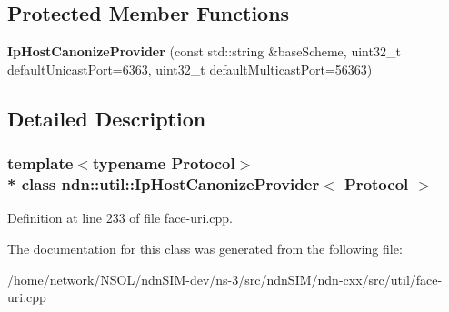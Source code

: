 \subsection*{Protected Member Functions}
\begin{DoxyCompactItemize}
\item 
{\bfseries Ip\+Host\+Canonize\+Provider} (const std\+::string \&base\+Scheme, uint32\+\_\+t default\+Unicast\+Port=6363, uint32\+\_\+t default\+Multicast\+Port=56363)\hypertarget{classndn_1_1util_1_1IpHostCanonizeProvider_af6c9093871592b3c6cec4cd4731137be}{}\label{classndn_1_1util_1_1IpHostCanonizeProvider_af6c9093871592b3c6cec4cd4731137be}

\end{DoxyCompactItemize}


\subsection{Detailed Description}
\subsubsection*{template$<$typename Protocol$>$\\*
class ndn\+::util\+::\+Ip\+Host\+Canonize\+Provider$<$ Protocol $>$}



Definition at line 233 of file face-\/uri.\+cpp.



The documentation for this class was generated from the following file\+:\begin{DoxyCompactItemize}
\item 
/home/network/\+N\+S\+O\+L/ndn\+S\+I\+M-\/dev/ns-\/3/src/ndn\+S\+I\+M/ndn-\/cxx/src/util/face-\/uri.\+cpp\end{DoxyCompactItemize}
